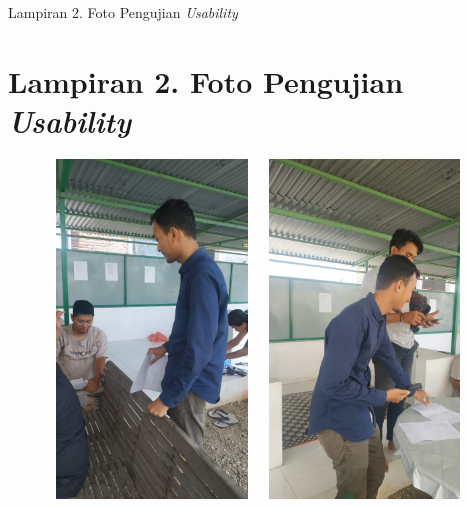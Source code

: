 \begin{appendices}{Lampiran 2. Foto Pengujian \textit{Usability}}
    \section*{Lampiran 2. Foto Pengujian \textit{Usability}}
    \begin{figure}[H]
            \hspace*{0.8cm}
            \includegraphics[width=5.5cm,height=9cm]{gambar/dokumentasi/foto1}
            \hspace*{0.3cm}
            \includegraphics[width=5.5cm,height=9cm]{gambar/dokumentasi/foto2}
    \end{figure}
        

\end{appendices}
